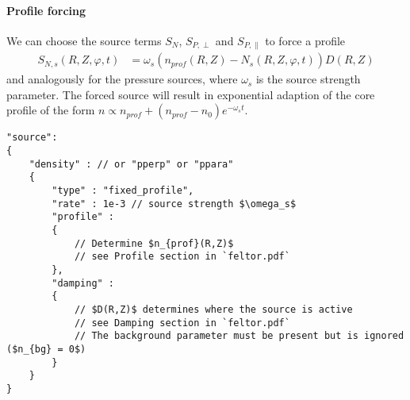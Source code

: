\paragraph{Profile forcing}
\noindent We can choose the source terms $S_N$, $S_{P,\perp}$ and $S_{P,\parallel}$ to force a profile
\begin{align} \label{eq:electron_source}
    S_{N,s}(R,Z,\varphi, t) &= \omega_s (n_{prof}(R,Z) - N_s(R,Z,\varphi, t))D(R,Z)
\end{align}
and analogously for the pressure sources,
where $\omega_s$ is the source strength parameter.
The forced source will result in exponential adaption of the core
profile of the form $n \propto n_{prof}+(n_{prof}-n_{0})e^{-\omega_st}$.
\begin{verbatim}
"source":
{
    "density" : // or "pperp" or "ppara"
    {
        "type" : "fixed_profile",
        "rate" : 1e-3 // source strength $\omega_s$
        "profile" :
        {
            // Determine $n_{prof}(R,Z)$
            // see Profile section in `feltor.pdf`
        },
        "damping" :
        {
            // $D(R,Z)$ determines where the source is active
            // see Damping section in `feltor.pdf`
            // The background parameter must be present but is ignored ($n_{bg} = 0$)
        }
    }
}
\end{verbatim}

